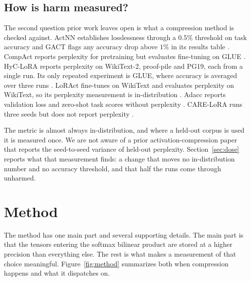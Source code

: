 \documentclass[11pt,letterpaper]{article}
\begin{document}
\subsection{How is harm measured?}
\label{sec:related_measure}

The second question prior work leaves open is what a compression method is checked against. ActNN establishes losslessness through a $0.5\%$ threshold on task accuracy \citep{chen2021actnn} and GACT flags any accuracy drop above $1\%$ in its results table \citep{liu2022gact}. CompAct reports perplexity for pretraining but evaluates fine-tuning on GLUE \citep{shamshoum2025compact}. HyC-LoRA reports perplexity on WikiText-2, proof-pile and PG19, each from a single run. Its only repeated experiment is GLUE, where accuracy is averaged over three runs \citep{hyclora2025}. LoRAct fine-tunes on WikiText and evaluates perplexity on WikiText, so its perplexity measurement is in-distribution \citep{loract2025}. Adacc reports validation loss and zero-shot task scores without perplexity \citep{adacc2025}. CARE-LoRA runs three seeds but does not report perplexity \citep{carelora2026}.

The metric is almost always in-distribution, and where a held-out corpus is used it is measured once. We are not aware of a prior activation-compression paper that reports the seed-to-seed variance of held-out perplexity. Section~\ref{sec:dose} reports what that measurement finds: a change that moves no in-distribution number and no accuracy threshold, and that half the runs come through unharmed.

\section{Method}
\label{sec:method}

The method has one main part and several supporting details. The main part is that the tensors entering the softmax bilinear product are stored at a higher precision than everything else. The rest is what makes a measurement of that choice meaningful. Figure~\ref{fig:method} summarizes both when compression happens and what it dispatches on.
\end{document}
